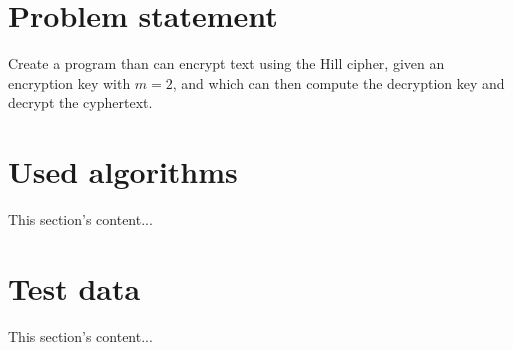 \documentclass[a4paper,12pt]{article}
\author{Roland Szabo, gr. 235}
\begin{document}
\section{Problem statement}
Create a program than can encrypt text using the Hill cipher, given an encryption key with $m = 2$, and which can then compute the decryption key and decrypt the cyphertext.

\section{Used algorithms}
This section's content...

\section{Test data}
This section's content...
\end{document}
